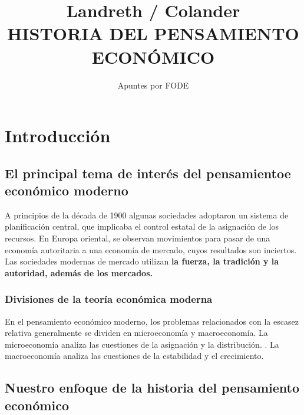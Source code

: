 \documentclass[10pt]{book}
\begin{document}
\normalfont

\author{\Large Apuntes por FODE}
\title{\small Landreth / Colander \\ \vspace{1cm} \large HISTORIA DEL PENSAMIENTO ECONÓMICO}
\date{}
\pagestyle{empty}
\maketitle
\thispagestyle{empty}
\let\cleardoublepage\clearpage
\tableofcontents								%


 
\let\cleardoublepage\clearpage

\chapter{Introducción}
\section*{El principal tema de interés del pensamientoe económico moderno}
A principios de la década de 1900 algunas sociedades adoptaron un sistema de planificación central, que implicaba el control estatal de la asignación de los recursos. En Europa oriental, se observan movimientos para pasar de una economía autoritaria a una economía de mercado, cuyos resultados son inciertos.\\
Las sociedades modernas de mercado utilizan \textbf{la fuerza, la tradición y la autoridad, además de los mercados.}\\
\subsection*{Divisiones de la teoría económica moderna}
En el pensamiento económico moderno, los problemas relacionados con la escasez relativa generalmente se dividen en microeconomía y macroeconomía. La microeconomía analiza las cuestiones de la asignación y la distribución. . La macroeconomía analiza las cuestiones de la estabilidad y el crecimiento. 
\section*{Nuestro enfoque de la historia del pensamiento económico}
\end{document}
